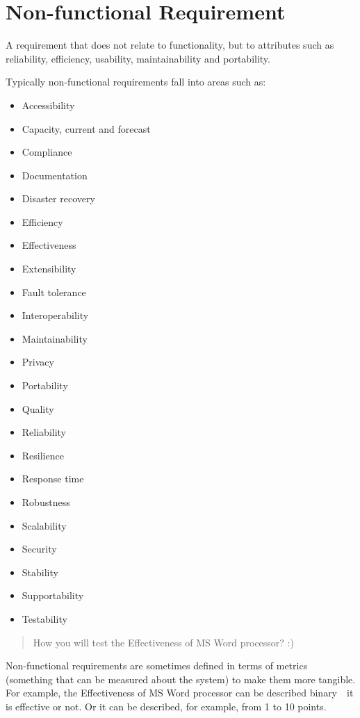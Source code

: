 \section{Non-functional Requirement}
\label{sec:Non-functional Requirement}

A requirement that does not relate to functionality, but to attributes such as reliability, efficiency, usability, maintainability and portability.

Typically non-functional requirements fall into areas such as:
\begin{itemize}
\item 
Accessibility
\item     Capacity, current and forecast
   \item  Compliance
    \item Documentation
  \item   Disaster recovery
    \item Efficiency
    \item Effectiveness
    \item Extensibility
   \item  Fault tolerance
    \item Interoperability
   \item  Maintainability
   \item  Privacy
   \item  Portability
   \item  Quality
  \item   Reliability
   \item  Resilience
   \item  Response time
    \item Robustness
   \item  Scalability
  \item   Security
   \item  Stability
  \item   Supportability
   \item  Testability               \end{itemize}

\begin{quote}
How you will test the Effectiveness of MS Word processor? :)
\end{quote} 

Non-functional requirements are sometimes defined in terms of metrics (something that can be measured about the system) to make them more tangible. For example, the Effectiveness of MS Word processor can be described binary~\textemdash~it is effective or not. Or it can be described, for example, from 1 to 10 points.

